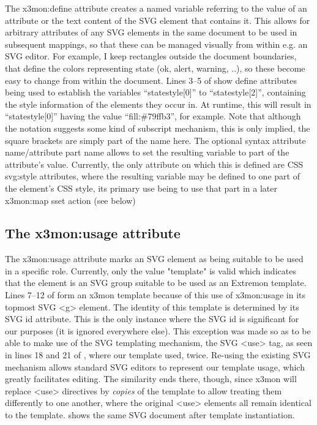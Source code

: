 
The x3mon:define attribute creates a named variable referring to the
value of an attribute or the text content of the SVG element that
contains it. This allows for arbitrary attributes of any SVG elements
in the same document to be used in subsequent mappings, so that these
can be managed visually from within e.g. an SVG editor. For example, I
keep rectangles outside the document boundaries, that define the colors
representing state (ok, alert, warning, ..), so these become easy to
change from within the document. Lines 3--5 of  show
define attributes being used to establish the variables ``statestyle[0]''
to ``statestyle[2]'', containing the style information of the elements
they occur in. At runtime, this will result in ``statestyle[0]''
having the value ``fill:\#79ffb3'', for example. Note that although
the notation suggests some kind of subscript mechanism, this is only
implied, the square brackets are simply part of the name here. The
optional syntax attribute name\slash{}attribute part name allows to set
the resulting variable to part of the attribute's value. Currently, the
only attribute on which this is defined are CSS svg:style attributes,
where the resulting variable may be defined to one part of the element's
CSS style, its primary use being to use that part in a later x3mon:map
sset action (see below)

\subsection*{The x3mon:usage attribute}


The x3mon:usage attribute marks an SVG element as being suitable to
be used in a specific role. Currently, only the value "template" is
valid which indicates that the element is an SVG group suitable to be
used as an Extremon template. Lines 7--12 of 
form an x3mon template because of this use of x3mon:usage in its
topmost SVG <g> element. The identity of this template is determined
by its SVG id attribute.  This is the only instance where the SVG
id is significant for our purposes (it is ignored everywhere else).
This exception was made so as to be able to make
use of the SVG templating mechanism, the SVG <use> tag, as seen in
lines 18 and 21 of , where our template used,
twice. Re-using the existing SVG mechanism allows standard SVG editors
to represent our template usage, which greatly facilitates editing.
The similarity ends there, though, since x3mon will replace <use>
directives by \emph{copies} of the template to allow treating them
differently to one another, where the original <use> elements all remain
identical to the template.  shows the same SVG
document after template instantiation.

